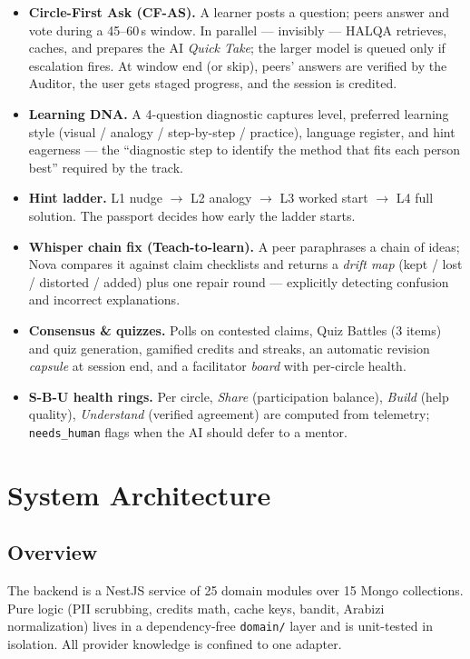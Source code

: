 \documentclass[10pt,twocolumn]{IEEEtran}
\begin{document}
\begin{itemize}
\item \textbf{Circle-First Ask (CF-AS).} A learner posts a question; peers answer and vote during a 45--60\,s window. In parallel --- invisibly --- HALQA retrieves, caches, and prepares the AI \emph{Quick Take}; the larger model is queued only if escalation fires. At window end (or skip), peers' answers are verified by the Auditor, the user gets staged progress, and the session is credited.
\item \textbf{Learning DNA.} A 4-question diagnostic captures level, preferred learning style (visual / analogy / step-by-step / practice), language register, and hint eagerness --- the ``diagnostic step to identify the method that fits each person best'' required by the track.
\item \textbf{Hint ladder.} L1 nudge $\rightarrow$ L2 analogy $\rightarrow$ L3 worked start $\rightarrow$ L4 full solution. The passport decides how early the ladder starts.
\item \textbf{Whisper chain fix (Teach-to-learn).} A peer paraphrases a chain of ideas; Nova compares it against claim checklists and returns a \emph{drift map} (kept / lost / distorted / added) plus one repair round --- explicitly detecting confusion and incorrect explanations.
\item \textbf{Consensus \& quizzes.} Polls on contested claims, Quiz Battles (3 items) and quiz generation, gamified credits and streaks, an automatic revision \emph{capsule} at session end, and a facilitator \emph{board} with per-circle health.
\item \textbf{S-B-U health rings.} Per circle, \emph{Share} (participation balance), \emph{Build} (help quality), \emph{Understand} (verified agreement) are computed from telemetry; \texttt{needs\_human} flags when the AI should defer to a mentor.
\end{itemize}

\section{System Architecture}
\subsection{Overview}
The backend is a NestJS service of 25 domain modules over 15 Mongo collections. Pure logic (PII scrubbing, credits math, cache keys, bandit, Arabizi normalization) lives in a dependency-free \texttt{domain/} layer and is unit-tested in isolation. All provider knowledge is confined to one adapter.
\end{document}
